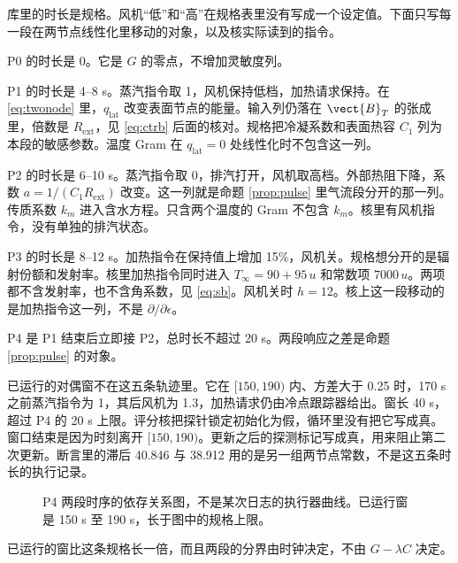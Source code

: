 库里的时长是规格。风机“低”和“高”在规格表里没有写成一个设定值。下面只写每一段在两节点线性化里移动的对象，以及核实际读到的指令。

P0 的时长是 0。它是 \(G\) 的零点，不增加灵敏度列。

P1 的时长是 4--8 s。蒸汽指令取 1，风机保持低档，加热请求保持。在 \eqref{eq:twonode} 里，\(q_{\mathrm{lat}}\) 改变表面节点的能量。输入列仍落在 \(\vect{B}_T\) 的张成里，倍数是 \(R_{\mathrm{ext}}\)，见 \eqref{eq:ctrb} 后面的核对。规格把冷凝系数和表面热容 \(C_1\) 列为本段的敏感参数。温度 Gram 在 \(q_{\mathrm{lat}}=0\) 处线性化时不包含这一列。

P2 的时长是 6--10 s。蒸汽指令取 0，排汽打开，风机取高档。外部热阻下降，系数 \(a=1/(C_1 R_{\mathrm{ext}})\) 改变。这一列就是命题 \ref{prop:pulse} 里气流段分开的那一列。传质系数 \(k_m\) 进入含水方程。只含两个温度的 Gram 不包含 \(k_m\)。核里有风机指令，没有单独的排汽状态。

P3 的时长是 8--12 s。加热指令在保持值上增加 15\%，风机关。规格想分开的是辐射份额和发射率。核里加热指令同时进入 \(T_\infty=90+95\,u\) 和常数项 \(7000\,u\)。两项都不含发射率，也不含角系数，见 \eqref{eq:sb}。风机关时 \(h=12\)。核上这一段移动的是加热指令这一列，不是 \(\partial/\partial\epsilon\)。

P4 是 P1 结束后立即接 P2，总时长不超过 20 s。两段响应之差是命题 \ref{prop:pulse} 的对象。

已运行的对偶窗不在这五条轨迹里。它在 \([150,190)\) 内、方差大于 0.25 时，170 s 之前蒸汽指令为 1，其后风机为 1.3，加热请求仍由冷点跟踪器给出。窗长 40 s，超过 P4 的 20 s 上限。评分核把探针锁定初始化为假，循环里没有把它写成真。窗口结束是因为时刻离开 \([150,190)\)。更新之后的探测标记写成真，用来阻止第二次更新。断言里的滞后 40.846 与 38.912 用的是另一组两节点常数，不是这五条时长的执行记录。

\begin{figure}[ht]
\centering
{}
\caption{P4 两段时序的依存关系图，不是某次日志的执行器曲线。已运行窗是 150 s 至 190 s，长于图中的规格上限。}
\end{figure}

已运行的窗比这条规格长一倍，而且两段的分界由时钟决定，不由 \(G-\lambda C\) 决定。

